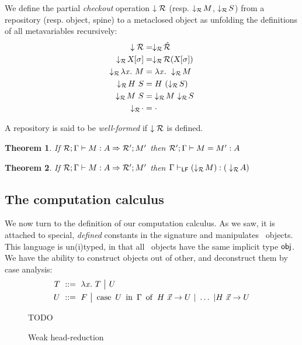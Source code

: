 \documentclass[9pt]{sigplanconf}
\newtheorem{theorem}{Theorem}
\begin{document}
We define the partial \emph{checkout} operation $\downarrow{\mathcal{R}}$
(resp. $\downarrow_{\mathcal{R}}\!{M}$, $\downarrow_{\mathcal{R}}\!{S}$) from a repository
(resp. object, spine) to a metaclosed object as unfolding the
definitions of all metavariables recursively:
\begin{align*}
  \checkout{\mr} &= \checkoutr{\hat{\mr}} \\
  \checkoutr{\smeta X \sigma} &= \checkoutr{\mr(\smeta X\sigma)}\\
  \checkoutr{\lam x M} &= \lam x \checkoutr{M} \\
  \checkoutr{\app H S} &= \app H {(\checkoutr{S})} \\
  \checkoutr{\spinecons M S} &= \spinecons {\checkoutr M} {\checkoutr S} \\
  \checkoutr{\spinenil} &= \spinenil
\end{align*}

A repository is said to be \emph{well-formed} if $\downarrow{\mathcal{R}}$
is defined.

\begin{theorem}
  If \/ ${{\mathcal{R}}; {\Gamma}}\vdash{{{{M}: {A}}}\Rightarrow{{\mathcal{R'}}; {M'}}}$ then \/ ${{\mathcal{R'}}; {\Gamma}}\vdash{{M}={M'}:{A}}$
\end{theorem}

\begin{theorem}
  If \/ ${{\mathcal{R}}; {\Gamma}}\vdash{{{{M}: {A}}}\Rightarrow{{\mathcal{R'}}; {M'}}}$ then \/ ${\Gamma}\vdash_{\text{\rm\sf{LF}}}{{(\downarrow_{\mathcal{R}}\!{M})}:{(}}\downarrow_{\mathcal{R}}\!{A})$
\end{theorem}

\subsection{The computation calculus}
\label{sec:computational-calculus}

We now turn to the definition of our computation calculus. As we saw,
it is attached to special, \emph{defined} constants in the signature
and manipulates \LF\ objects. This language is un(i)typed, in that all
\LF\ objects have the same implicit type $\text{\textsf{obj}}$. We have the
ability to construct objects out of other, and deconstruct them by
case analysis:
\begin{align*}
  T &\ ::=\ 
  \lambda{\ensuremath{\text{\textit{x}}}}.\  T \ {\big|}\ 
  U \\
  U &\ ::=\ 
  F \ {\big|}\ 
  \operatorname{case}\ {{U}\ \operatorname{in}\ {\Gamma}}\ \operatorname{of}\  {{H}\  {\vec x}}\to U\ |\ \ldots\
  |{{H}\  {\vec x}}\to U
\end{align*}

\begin{figure*}
  \centering
  TODO
  \caption{Weak head-reduction}
  \label{fig:whr}
\end{figure*}
\end{document}
